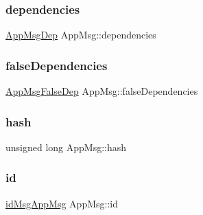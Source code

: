 \subsubsection{\texorpdfstring{dependencies}{dependencies}}
{\footnotesize\ttfamily \hyperlink{_app_msg__m_8h_a39bb58326d7e24febcd7397c022ada6a}{App\+Msg\+Dep} App\+Msg\+::dependencies\hspace{0.3cm}{\ttfamily [protected]}}

\mbox{\label{class_app_msg_a2e1c93236ae4ceb0fc5571a5b044c454}} 
\subsubsection{\texorpdfstring{false\+Dependencies}{falseDependencies}}
{\footnotesize\ttfamily \hyperlink{_app_msg__m_8h_a2b8cadfd13c916ddccf5a213ca34d8ee}{App\+Msg\+False\+Dep} App\+Msg\+::false\+Dependencies\hspace{0.3cm}{\ttfamily [protected]}}

\mbox{\label{class_app_msg_a8b73e331d42d97d9e51603dc5352307f}} 
\subsubsection{\texorpdfstring{hash}{hash}}
{\footnotesize\ttfamily unsigned long App\+Msg\+::hash\hspace{0.3cm}{\ttfamily [protected]}}

\mbox{\label{class_app_msg_aadaa93732c4df84c8b2ef13d7199f9a1}} 
\subsubsection{\texorpdfstring{id}{id}}
{\footnotesize\ttfamily \hyperlink{_app_msg__m_8h_a0bd5e3a5ba85ac1fa0fd0fae34d903c1}{id\+Msg\+App\+Msg} App\+Msg\+::id\hspace{0.3cm}{\ttfamily [protected]}}

\mbox{\label{class_app_msg_a0dceb6642736a90673422df92ab3d788}} 

